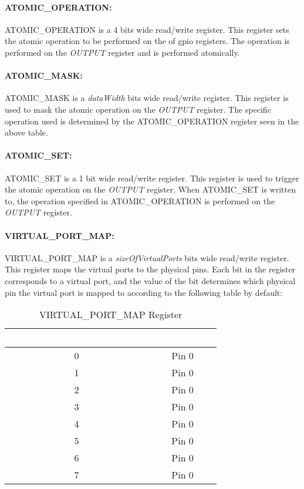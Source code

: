 % 
\paragraph{ATOMIC\_OPERATION:}
ATOMIC\_OPERATION is a 4 bits wide read/write register. This register sets the atomic operation to be performed on the
of gpio registers. The operation is performed on the \textit{OUTPUT} register and is performed atomically.

\paragraph{ATOMIC\_MASK:}
ATOMIC\_MASK is a \textit{dataWidth} bits wide read/write register. This register is used to mask the atomic operation on the \textit{OUTPUT} register. 
The specific operation used is determined by the ATOMIC\_OPERATION register seen in the above table.

\paragraph{ATOMIC\_SET:}
ATOMIC\_SET is a 1 bit wide read/write register. This register is used to trigger the atomic operation on the \textit{OUTPUT} register. 
When ATOMIC\_SET is written to, the operation specified in ATOMIC\_OPERATION is performed on the \textit{OUTPUT} register.

\paragraph{VIRTUAL\_PORT\_MAP:}
VIRTUAL\_PORT\_MAP is a \textit{sizeOfVirtualPorts} bits wide read/write register. This register maps the virtual ports to the physical pins.
Each bit in the register corresponds to a virtual port, and the value of the bit determines which physical pin the virtual port is mapped to 
according to the following table by default:
\begin{table}[h]
  \centering
  \begin{tabular}{|c|c|}
      \hline
      \rowcolor{dark-gray}  %
      \textcolor{white}{\textbf{VIRTUAL\_PORT\_MAP[n]}} & \textcolor{white}{\textbf{Physical Pin}} \\ \hline
      0 & Pin 0 \\ \hline
      1 & Pin 0 \\ \hline
      2 & Pin 0 \\ \hline
      3 & Pin 0 \\ \hline
      4 & Pin 0 \\ \hline
      5 & Pin 0 \\ \hline
      6 & Pin 0 \\ \hline
      7 & Pin 0 \\ \hline
  \end{tabular}
  \caption{VIRTUAL\_PORT\_MAP Register}
\end{table}

